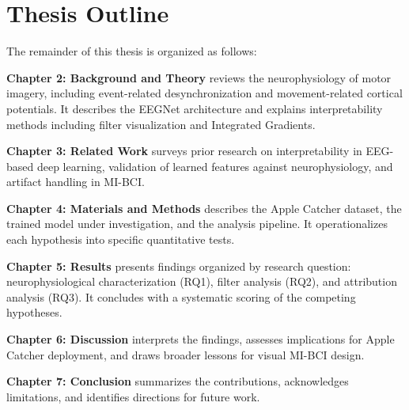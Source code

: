 \section{Thesis Outline}
\label{sec:intro_outline}

The remainder of this thesis is organized as follows:

\textbf{Chapter 2: Background and Theory} reviews the neurophysiology of motor imagery, including event-related desynchronization and movement-related cortical potentials. It describes the EEGNet architecture and explains interpretability methods including filter visualization and Integrated Gradients.

\textbf{Chapter 3: Related Work} surveys prior research on interpretability in EEG-based deep learning, validation of learned features against neurophysiology, and artifact handling in MI-BCI.

\textbf{Chapter 4: Materials and Methods} describes the Apple Catcher dataset, the trained model under investigation, and the analysis pipeline. It operationalizes each hypothesis into specific quantitative tests.

\textbf{Chapter 5: Results} presents findings organized by research question: neurophysiological characterization (RQ1), filter analysis (RQ2), and attribution analysis (RQ3). It concludes with a systematic scoring of the competing hypotheses.

\textbf{Chapter 6: Discussion} interprets the findings, assesses implications for Apple Catcher deployment, and draws broader lessons for visual MI-BCI design.

\textbf{Chapter 7: Conclusion} summarizes the contributions, acknowledges limitations, and identifies directions for future work.





